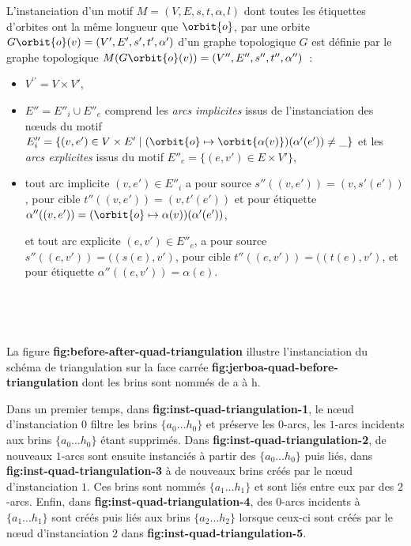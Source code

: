 L'instanciation d'un motif $M=(V,E,s,t,\alpha,l)$ dont toutes les étiquettes d'orbites ont la même longueur que $\orbit{o}$, par une orbite $G\orbit{o}(v)=(V',E',s',t',\alpha')$ d'un graphe topologique $G$ est définie par le graphe topologique $M(G\orbit{o}(v))=(V'',E'',s'',t'',\alpha'')$~:
\begin{itemize}
	\item $V^{\prime\prime}= V \times V'$,

	\item $E''=E''_i \cup E''_e$ comprend les \emph{arcs implicites} issus de l'instanciation des nœuds du motif $E''_i = \{ (v, e') \in V \times E' \mid (\orbit{o} \mapsto \orbit{\alpha(v)})(\alpha'(e')) \neq \_ \}$ et les \emph{arcs explicites} issus du motif $E''_e = \{ (e, v') \in E \times V' \}$,

	\item tout arc implicite $(v,e') \in E''_i$ a pour source $s''((v,e'))=(v,s'(e'))$, pour cible $t''((v,e'))=(v,t'(e'))$ et pour étiquette $\alpha''((v,e'))=(\orbit{o} \mapsto \alpha(v))(\alpha'(e'))$,

	      et tout arc explicite $(e,v') \in E''_e$, a pour source $s''((e,v')) = ((s(e),v')$, pour cible $t''((e,v')) = ((t(e),v')$, et pour étiquette $\alpha''((e, v')) = \alpha(e)$.
\end{itemize}

~




~

La figure \textbf{fig:before-after-quad-triangulation} illustre l'instanciation du schéma de triangulation sur la face carrée \textbf{fig:jerboa-quad-before-triangulation} dont les brins sont nommés de a à h.

Dans un premier temps, dans \textbf{fig:inst-quad-triangulation-1}, le nœud d'instanciation $0$ filtre les brins $\{a_0 \dots h_0\}$ et préserve les $0$-arcs, les $1$-arcs incidents aux brins $\{a_0 \dots h_0\}$ étant supprimés.
Dans \textbf{fig:inst-quad-triangulation-2}, de nouveaux $1$-arcs sont ensuite instanciés à partir des $\{a_0 \dots h_0\}$ puis liés, dans \textbf{fig:inst-quad-triangulation-3} à de nouveaux brins créés par le nœud d'instanciation $1$. Ces brins sont nommés $\{a_1 \dots h_1\}$ et sont liés entre eux par des $2$-arcs.
Enfin, dans \textbf{fig:inst-quad-triangulation-4}, des $0$-arcs incidents à $\{a_1 \dots h_1\}$ sont créés puis liés aux brins $\{a_2 \dots h_2\}$ lorsque ceux-ci sont créés par le nœud d'instanciation $2$ dans \textbf{fig:inst-quad-triangulation-5}.

